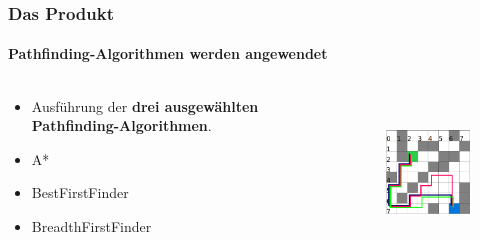 \documentclass[professionalfont,serif,german]{beamer}
\begin{document}
\begin{frame}
  \frametitle{Das Produkt}
  \framesubtitle{Pathfinding-Algorithmen werden angewendet}
  \begin{columns}
    \begin{column}[T]{0.5\textwidth}
      \begin{itemize}
        \item Ausführung der \textbf{drei ausgewählten Pathfinding-Algorithmen}.
        \item \textcolor{pfblue}{A*}
        \item \textcolor{pfred}{BestFirstFinder}
        \item \textcolor{pfgreen}{BreadthFirstFinder}
      \end{itemize}
    \end{column}
    \begin{column}[T]{0.5\textwidth}
      \begin{figure}
        \includegraphics[height=4cm]{img/grid3.png}
      \end{figure}
    \end{column}
  \end{columns}
\end{frame}
\end{document}

